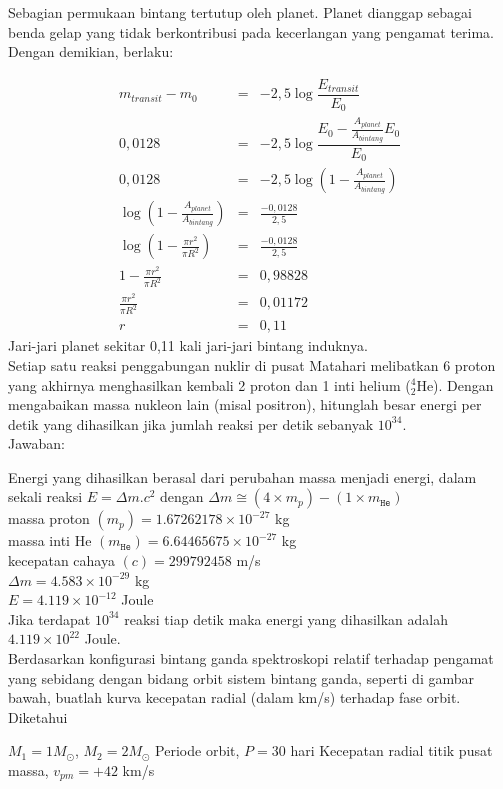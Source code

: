 \documentclass[11pt,fleqn]{exam}
\begin{document}
\begin{questions}
Sebagian permukaan bintang tertutup oleh planet. Planet dianggap sebagai benda gelap yang tidak berkontribusi pada kecerlangan yang pengamat terima. Dengan demikian, berlaku:

\begin{eqnarray*}
m_{transit}-m_0 &=& -2,5\log \dfrac{E_{transit}}{E_0}\\
0,0128&=&  -2,5\log \dfrac{E_0-\frac{A_{planet}}{A_{bintang}}E_0}{E_0}\\
0,0128&=&  -2,5\log (1-\frac{A_{planet}}{A_{bintang}})\\
\log (1-\frac{A_{planet}}{A_{bintang}})&=&\frac{-0,0128}{2,5}\\
\log (1-\frac{\pi r^2}{\pi R^2})&=&\frac{-0,0128}{2,5}\\
1-\frac{\pi r^2}{\pi R^2}&=&0,98828\\
\frac{\pi r^2}{\pi R^2}&=&0,01172\\
r&=&0,11
\end{eqnarray*}
Jari-jari planet sekitar 0,11 kali jari-jari bintang induknya.\\


\question Setiap satu reaksi penggabungan nuklir di pusat Matahari melibatkan 6 proton yang akhirnya menghasilkan kembali 2 proton dan 1 inti helium ($^{4}_{2}$He). Dengan mengabaikan massa nukleon lain (misal positron), hitunglah besar energi per detik yang dihasilkan jika jumlah reaksi per detik sebanyak $10^{34}$.\\

Jawaban:

Energi yang dihasilkan berasal dari perubahan massa menjadi energi, dalam sekali reaksi $E = \Delta m . c^{2}$ dengan $\Delta m \cong (4 \times m_p) - (1 \times m_{\texttt{He}})$\\
massa proton $(m_p) = 1.67262178 \times 10^{-27}$ kg\\
massa inti He $(m_{\texttt{He}}) = 6.64465675 \times 10^{-27} $ kg\\
kecepatan cahaya $(c) = 299792458$ m/s\\   
$\Delta m = 4.583 \times 10^{-29}$ kg\\
$E = 4.119 \times 10^{-12}$ Joule\\
Jika terdapat $10^{34}$ reaksi tiap detik maka energi yang dihasilkan adalah $4.119 \times 10^{22}$ Joule.\\


\question Berdasarkan konfigurasi bintang ganda spektroskopi relatif terhadap pengamat yang sebidang dengan bidang orbit sistem bintang ganda, seperti di gambar bawah, buatlah kurva kecepatan radial (dalam km/s) terhadap fase orbit. Diketahui
\begin{choices}
\choice $M_1=1M_{\odot}$, $M_2=2M_{\odot}$
\choice Periode orbit, $P=30$ hari
\choice Kecepatan radial titik pusat massa, $v_{pm}=+42$ km/s
\end{choices}


\end{questions}
\end{document}
